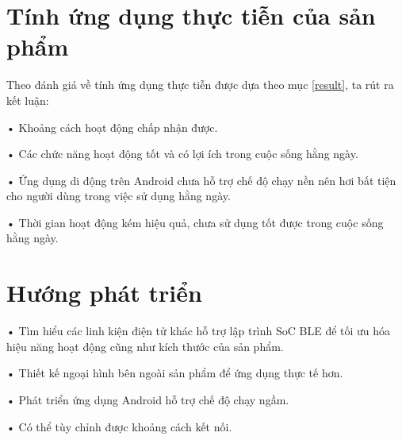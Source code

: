 \section{Tính ứng dụng thực tiễn của sản phẩm}

Theo đánh giá về tính ứng dụng thực tiễn được dựa theo mục \ref{result}, ta rút ra kết luận:

• Khoảng cách hoạt động chấp nhận được.

• Các chức năng hoạt động tốt và có lợi ích trong cuộc sống hằng ngày.

• Ứng dụng di động trên Android chưa hỗ trợ chế độ chạy nền nên hơi bất tiện cho người dùng trong việc sử dụng hằng ngày.

• Thời gian hoạt động kém hiệu quả, chưa sử dụng tốt được trong cuộc sống hằng ngày.

\section{Hướng phát triển}

• Tìm hiểu các linh kiện điện tử khác hỗ trợ lập trình SoC BLE để tối ưu hóa hiệu năng hoạt động cũng như kích thước của sản phẩm.

• Thiết kế ngoại hình bên ngoài sản phẩm để ứng dụng thực tế hơn.

• Phát triển ứng dụng Android hỗ trợ chế độ chạy ngầm.

• Có thể tùy chỉnh được khoảng cách kết nối.
